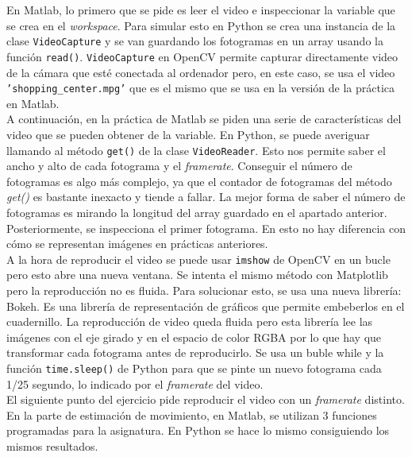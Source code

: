 En Matlab, lo primero que se pide es leer el video e inspeccionar la variable que se crea en el \emph{workspace}. Para simular esto en Python se crea una instancia de la clase \texttt{VideoCapture} y se van guardando los fotogramas en un array usando la función \texttt{read()}. \texttt{VideoCapture} en OpenCV permite capturar directamente video de la cámara que esté conectada al ordenador pero, en este caso, se usa el video \texttt{'shopping\_center.mpg'} que es el mismo que se usa en la versión de la práctica en Matlab.\\

A continuación, en la práctica de Matlab se piden una serie de características del video que se pueden obtener de la variable. En Python, se puede averiguar llamando al método \texttt{get()} de la clase \texttt{VideoReader}. Esto nos permite saber el ancho y alto de cada fotograma y el \emph{framerate}. Conseguir el número de fotogramas es algo más complejo, ya que el contador de fotogramas del método \emph{get()} es bastante inexacto y tiende a fallar. La mejor forma de saber el número de fotogramas es mirando la longitud del array guardado en el apartado anterior.\\

Posteriormente, se inspecciona el primer fotograma. En esto no hay diferencia con cómo se representan imágenes en prácticas anteriores.\\

A la hora de reproducir el video se puede usar \texttt{imshow} de OpenCV en un bucle pero esto abre una nueva ventana. Se intenta el mismo método con Matplotlib pero la reproducción no es fluida. Para solucionar esto, se usa una nueva librería: Bokeh. Es una librería de representación de gráficos que permite embeberlos en el cuadernillo. La reproducción de video queda fluida pero esta librería lee las imágenes con el eje girado y en el espacio de color RGBA por lo que hay que transformar cada fotograma antes de reproducirlo. Se usa un buble while y la función \texttt{time.sleep()} de Python para que se pinte un nuevo fotograma cada 1/25 segundo, lo indicado por el \emph{framerate} del video.\\

El siguiente punto del ejercicio pide reproducir el video con un \emph{framerate} distinto.\\

En la parte de estimación de movimiento, en Matlab, se utilizan 3 funciones programadas para la asignatura. En Python se hace lo mismo consiguiendo los mismos resultados. \\

